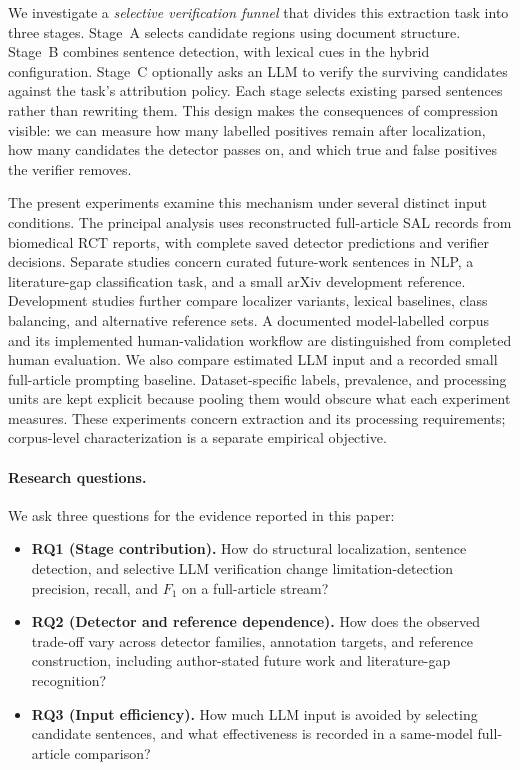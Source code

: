 We investigate a \emph{selective verification funnel} that divides this extraction task into
three stages. Stage~A selects candidate regions using document structure. Stage~B combines sentence
detection, with lexical cues in the hybrid configuration. Stage~C optionally asks an LLM to verify the surviving candidates
against the task's attribution policy. Each stage selects existing parsed sentences rather than
rewriting them. This design makes the consequences of compression visible: we can measure how
many labelled positives remain after localization, how many candidates the detector passes on,
and which true and false positives the verifier removes.

The present experiments examine this mechanism under several distinct input conditions. The
principal analysis uses reconstructed full-article SAL records from biomedical RCT reports, with
complete saved detector predictions and verifier decisions. Separate studies concern curated
future-work sentences in NLP, a literature-gap classification task, and a small arXiv development
reference. Development studies further compare localizer variants, lexical baselines, class
balancing, and alternative reference sets. A documented model-labelled corpus and its implemented
human-validation workflow are distinguished from completed human evaluation. We also compare estimated LLM input and a recorded small full-article prompting baseline.
Dataset-specific labels, prevalence, and processing units are kept explicit because pooling them
would obscure what each experiment measures. These experiments concern extraction and its
processing requirements; corpus-level characterization is a separate empirical objective.

\paragraph{Research questions.}
We ask three questions for the evidence reported in this paper:
\begin{itemize}
  \item \textbf{RQ1 (Stage contribution).} How do structural localization, sentence detection,
        and selective LLM verification change limitation-detection precision, recall, and $F_1$
        on a full-article stream?
  \item \textbf{RQ2 (Detector and reference dependence).} How does the observed trade-off vary
        across detector families, annotation targets, and reference construction, including
        author-stated future work and literature-gap recognition?
  \item \textbf{RQ3 (Input efficiency).} How much LLM input is avoided by selecting candidate
        sentences, and what effectiveness is recorded in a same-model full-article comparison?
\end{itemize}

